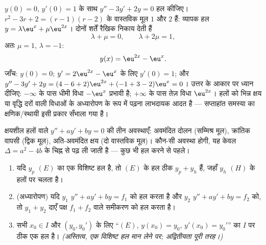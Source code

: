 \begin{example}[एक कोशी समस्या, आरंभ से अंत तक]\label{ex:b1:diffeq:cauchy2}
$y(0) = 0$, $y'(0) = 1$ के साथ $y'' - 3y' + 2y = 0$ हल कीजिए।  $r^2 - 3r + 2 = (r - 1)(r - 2)$ के वास्तविक मूल $1$ और $2$ हैं: व्यापक
हल $y = \lambda\eu^{x} + \mu\eu^{2x}$। दोनों शर्तें रैखिक निकाय देती हैं
\[
\lambda + \mu = 0, \qquad \lambda + 2\mu = 1 ,
\]
अतः $\mu = 1$, $\lambda = -1$:
\[
y(x) = \eu^{2x} - \eu^{x} .
\]
जाँच: $y(0) = 0$; $y' = 2\eu^{2x} - \eu^x$ के लिए $y'(0) = 1$; और $y'' - 3y'
+ 2y = (4 - 6 + 2)\eu^{2x} + (-1 + 3 - 2)\eu^x = 0$। उत्तर के आकार पर ध्यान
दीजिए: $-\infty$ के पास धीमी विधा $-\eu^x$ प्रभावी है; $+\infty$ के पास तेज़
विधा $\eu^{2x}$। हलों को भिन्न क्षय या वृद्धि दरों वाली विधाओं के अध्यारोपण
के रूप में पढ़ना लाभदायक आदत है --- सप्ताहांत समस्या का क्षणिक/स्थायी 
इसी प्रकार सँभाला गया है।
\end{example}

\begin{omfigure}

{\small क्षयशील हलों वाले $y'' + ay' + by = 0$ की तीन अवस्थाएँ: अवमंदित दोलन
(सम्मिश्र मूल), क्रांतिक वापसी (द्विक मूल), अति-अवमंदित क्षय (दो वास्तविक
मूल)। कौन-सी अवस्था होगी, यह केवल $\Delta = a^2 - 4b$ के चिह्न से पढ़ ली
जाती है --- कुछ भी हल करने से पहले।}
\end{omfigure}

\begin{theorem}\label{thm:b1:diffeq:structure2}
\begin{enumerate}
  \item यदि $y_p$ $(E)$ का एक विशिष्ट हल है, तो $(E)$ के हल ठीक $y_p + y_h$
  हैं, जहाँ $y_h$ $(H)$ के हलों पर चलता है।
  \item (अध्यारोपण) यदि $y_1$ $y'' + ay' + by = f_1$ को हल करता है और $y_2$
  $y'' + ay' + by = f_2$ को, तो $y_1 + y_2$ दाएँ पक्ष $f_1 + f_2$ वाले
  समीकरण को हल करता है।
  \item सभी $x_0 \in I$ और $(y_0, y_0')$ के लिए  ``$(E)$, $y(x_0)
  = y_0$, $y'(x_0) = y_0'$'' का $I$ पर ठीक एक हल है। \emph{(अस्तित्व, एक
  विशिष्ट हल मान लेने पर; अद्वितीयता पूरी तरह।)}
\end{enumerate}
\end{theorem}


